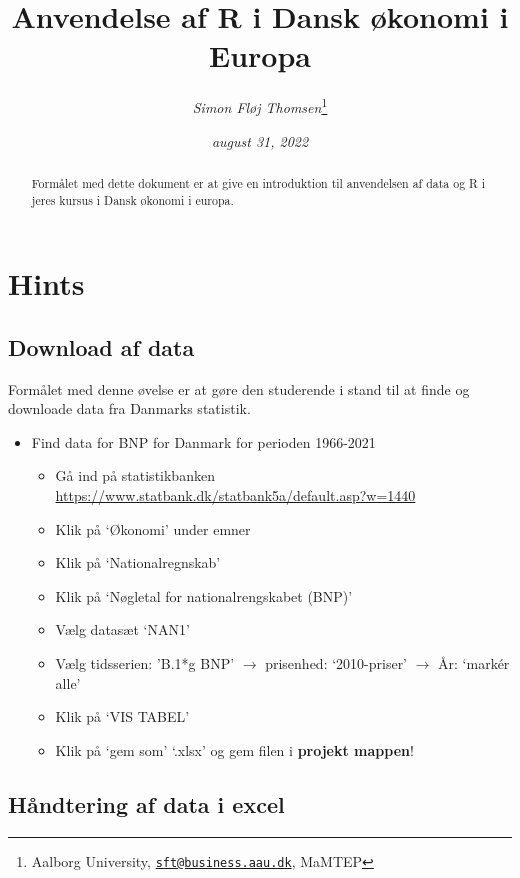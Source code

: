 \documentclass[
  12pt,
]{article}
\title{Anvendelse af R i Dansk økonomi i Europa}
\author{\emph{Simon Fløj Thomsen}\footnote{Aalborg University,
  \href{mailto:sft@business.aau.dk}{\nolinkurl{sft@business.aau.dk}},
  MaMTEP}}
\date{\emph{august 31, 2022}}
\providecommand{\tightlist}{%
  \setlength{\itemsep}{0pt}\setlength{\parskip}{0pt}}
\begin{document}
\maketitle
\begin{abstract}
\begingroup Formålet med dette dokument er at give en introduktion til
anvendelsen af data og R i jeres kursus i Dansk økonomi i europa.
\endgroup
\end{abstract}

\newpage

\hypertarget{hints}{%
\section{Hints}\label{hints}}

\hypertarget{download-af-data}{%
\subsection{Download af data}\label{download-af-data}}

Formålet med denne øvelse er at gøre den studerende i stand til at finde
og downloade data fra Danmarks statistik.

\begin{itemize}
\tightlist
\item
  Find data for BNP for Danmark for perioden 1966-2021

  \begin{itemize}
  \tightlist
  \item
    Gå ind på statistikbanken
    \url{https://www.statbank.dk/statbank5a/default.asp?w=1440}
  \item
    Klik på `Økonomi' under emner
  \item
    Klik på `Nationalregnskab'
  \item
    Klik på `Nøgletal for nationalrengskabet (BNP)'
  \item
    Vælg datasæt `NAN1'
  \item
    Vælg tidsserien: 'B.1*g BNP' \(\rightarrow\) prisenhed:
    `2010-priser' \(\rightarrow\) År: `markér alle'
  \item
    Klik på `VIS TABEL'
  \item
    Klik på `gem som' `.xlsx' og gem filen i \textbf{projekt mappen}!
  \end{itemize}
\end{itemize}

\hypertarget{huxe5ndtering-af-data-i-excel}{%
\subsection{Håndtering af data i
excel}\label{huxe5ndtering-af-data-i-excel}}
\end{document}
